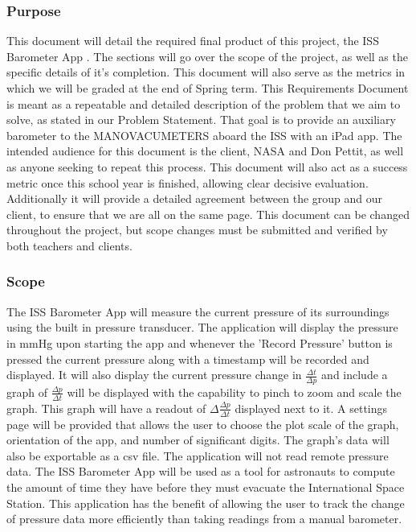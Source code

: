 \documentclass[onecolumn, draftclsnofoot,10pt, compsoc]{IEEEtran}
\def \CapstoneProjectName{ISS Barometer App }
\begin{document}
\subsubsection{Purpose}
This document will detail the required final product of this project, the \CapstoneProjectName.
The sections will go over the scope of the project, as well as the specific details of it's completion.
This document will also serve as the metrics in which we will be graded at the end of Spring term.
This Requirements Document is meant as a repeatable and detailed description of the problem that we aim to solve, as stated in our Problem Statement.
That goal is to provide an auxiliary barometer to the MANOVACUMETERS aboard the ISS with an iPad app.
The intended audience for this document is the client, NASA and Don Pettit, as well as anyone seeking to repeat this process.
This document will also act as a success metric once this school year is finished, allowing clear decisive evaluation.
Additionally it will provide a detailed agreement between the group and our client, to ensure that we are all on the same page.
This document can be changed throughout the project, but scope changes must be submitted and verified by both teachers and clients.

\subsubsection{Scope}
The \CapstoneProjectName will measure the current pressure of its surroundings using the built in pressure transducer.
The application will display the pressure in mmHg upon starting the app and whenever the 'Record Pressure' button is pressed the current pressure along with a timestamp will be recorded and displayed.
It will also display the current pressure change in $\frac{\Delta t}{\Delta p}$ and include a graph of $\frac{\Delta p}{\Delta t}$ will be displayed with the capability to pinch to zoom and scale the graph.
This graph will have a readout of $\Delta \frac{\Delta p}{\Delta t}$ displayed next to it.
A settings page will be provided that allows the user to choose the plot scale of the graph, orientation of the app, and number of significant digits.
The graph's data will also be exportable as a csv file.
The application will not read remote pressure data.
The \CapstoneProjectName will be used as a tool for astronauts to compute the amount of time they have before they must evacuate the International Space Station.
This application has the benefit of allowing the user to track the change of pressure data more efficiently than taking readings from a manual barometer.
\end{document}
